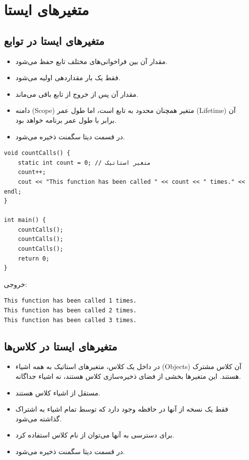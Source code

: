 \documentclass{article}
\begin{document}
\section*{متغیرهای ایستا}

\subsection*{متغیرهای ایستا در توابع}
\begin{itemize}
    \item مقدار آن بین فراخوانی‌های مختلف تابع حفظ می‌شود.
    \item فقط یک بار مقداردهی اولیه می‌شود.
    \item مقدار آن پس از خروج از تابع باقی می‌ماند.
    \item دامنه (Scope) متغیر همچنان محدود به تابع است، اما طول عمر (Lifetime) آن برابر با طول عمر برنامه خواهد بود.
    \item در قسمت دیتا سگمنت ذخیره می‌شود.
\end{itemize}


\begin{LTR} %
\begin{lstlisting}
void countCalls() {
    static int count = 0; // متغیر استاتیک
    count++;
    cout << "This function has been called " << count << " times." << endl;
}

int main() {
    countCalls();
    countCalls();
    countCalls();
    return 0;
}
\end{lstlisting}
\end{LTR}

خروجی:

\begin{LTR} %
\begin{lstlisting}
This function has been called 1 times.
This function has been called 2 times.
This function has been called 3 times.
\end{lstlisting}
\end{LTR}


\subsection*{متغیرهای ایستا در کلاس‌ها}
\begin{itemize}
    \item در داخل یک کلاس، متغیرهای استاتیک به همه اشیاء (Objects) آن کلاس مشترک هستند. این متغیرها بخشی از فضای ذخیره‌سازی کلاس هستند، نه اشیاء جداگانه.
    \item مستقل از اشیاء کلاس هستند.
    \item فقط یک نسخه از آنها در حافظه وجود دارد که توسط تمام اشیاء به اشتراک گذاشته می‌شود.
    \item برای دسترسی به آنها می‌توان از نام کلاس استفاده کرد.
    \item در قسمت دیتا سگمنت ذخیره می‌شود.
\end{itemize}
\end{document}
